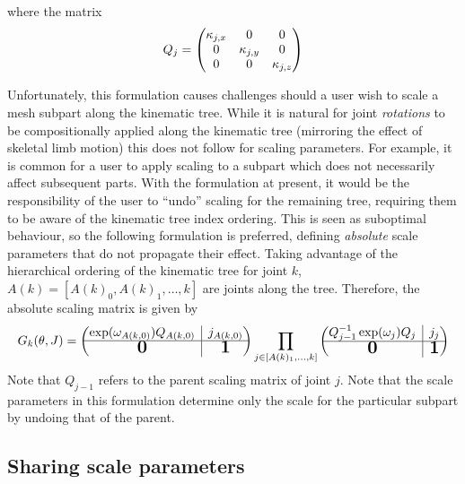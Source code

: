 where the matrix
\begin{equation}
    Q_{j} = \begin{pmatrix}
        \kappa_{j,x} & 0 & 0 \\
        0 & \kappa_{j,y} & 0 \\
        0 & 0 & \kappa_{j,z}
    \end{pmatrix}
\end{equation}

Unfortunately, this formulation causes challenges should a user wish to scale a mesh subpart along the kinematic tree. While it is natural for joint \emph{rotations} to be compositionally applied along the kinematic tree (mirroring the effect of skeletal limb motion) this does not follow for scaling parameters. For example, it is common for a user to apply scaling to a subpart which does not necessarily affect subsequent parts. With the formulation at present, it would be the responsibility of the user to ``undo'' scaling for the remaining tree, requiring them to be aware of the kinematic tree index ordering. This is seen as suboptimal behaviour, so the following formulation is preferred, defining \emph{absolute} scale parameters that do not propagate their effect. Taking advantage of the hierarchical ordering of the kinematic tree for joint $k$, $A(k) = \left[A(k)_{0}, A(k)_{1}, \dots, k\right]$ are joints along the tree. Therefore, the absolute scaling matrix is given by
\begin{equation}
    G_{k}(\pose,\smalrestJ) = 
    \begin{pmatrix}
        \exp(\poseele{A(k,0)}) Q_{A(k,0)}
        & \rvline 
        & j_{A(k,0)} \\
    \hline
        \bigzero
        & \rvline 
        & \bigone
    \end{pmatrix}
    \prod_{j \in \left[A(k)_{1}, \dots, k \right]}
        \begin{pmatrix}
            Q_{j-1}^{-1} \exp(\poseele{j}) Q_{j}
            & \rvline 
            & j_{j} \\
        \hline
            \bigzero
            & \rvline 
            & \bigone
        \end{pmatrix}
\end{equation}
Note that $Q_{j-1}$ refers to the parent scaling matrix of joint $j$. Note that the scale parameters in this formulation determine only the scale for the particular subpart by undoing that of the parent.

\subsection{Sharing scale parameters}

